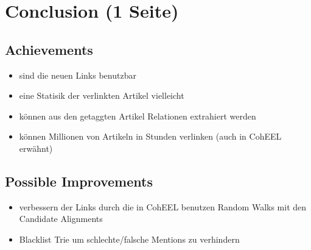 \section{Conclusion (1 Seite)}
\label{sec:Conclusion}
	\subsection*{Achievements}
	\begin{itemize}
		\item sind die neuen Links benutzbar
		\item eine Statisik der verlinkten Artikel vielleicht
		\item können aus den getaggten Artikel Relationen extrahiert werden
		\item können Millionen von Artikeln in Stunden verlinken (auch in CohEEL erwähnt)
	\end{itemize}

	\subsection*{Possible Improvements}
	\begin{itemize}
		\item verbessern der Links durch die in CohEEL benutzen Random Walks mit den Candidate Alignments
		\item Blacklist Trie um schlechte/falsche Mentions zu verhindern
	\end{itemize}

